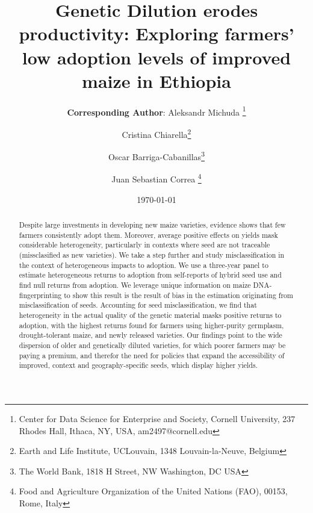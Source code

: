 \documentclass[11pt]{article}
\begin{document}
    \begin{titlepage}
    
    \title{Genetic Dilution erodes productivity: Exploring farmers' low adoption levels of improved maize in  Ethiopia}


\author{%
 \textbf{Corresponding Author}: Aleksandr Michuda \footnote{Center for Data Science for Enterprise and Society, Cornell University, 237 Rhodes Hall, Ithaca, NY, USA, am2497@cornell.edu}%
 \and Cristina Chiarella\footnote{Earth and Life Institute, UCLouvain, 1348 Louvain-la-Neuve, Belgium}%
 \and Oscar Barriga-Cabanillas\footnote{The World Bank, 1818 H Street, NW Washington, DC USA}%
  \and Juan Sebastian Correa \footnote{Food and Agriculture Organization of the United Nations (FAO), 00153, Rome, Italy}%
  }

	\date{\today}

    \clearpage\maketitle
	\thispagestyle{empty}
	\vspace*{-2em}
    \begin{center}\begin{abstract}
    \singlespacing
			\noindent  
			Despite large investments in developing new maize varieties, evidence shows that few farmers consistently adopt them. Moreover, average positive effects on yields mask considerable heterogeneity, particularly in contexts where seed are not traceable (missclasified as new varieties). We take a step further and study misclassification in the context of heterogeneous impacts to adoption. We use a three-year panel to estimate heterogeneous returns to adoption from self-reports of hybrid seed use and find null returns from adoption. We leverage unique information on maize DNA-fingerprinting to show this result is the result of bias in the estimation originating from  misclassification of seeds. Accounting for seed misclassification, we find that heterogeneity in the actual quality of the genetic material masks positive returns to adoption, with the highest returns found for farmers using higher-purity germplasm, drought-tolerant maize, and newly released varieties. Our findings point to the wide dispersion of older and genetically diluted varieties, for which poorer farmers may be paying a premium, and therefor the need for policies that expand the accessibility of improved, context and geography-specific seeds, which display higher yields.
			

\end{abstract}
\end{center}
\end{titlepage}
\end{document}
